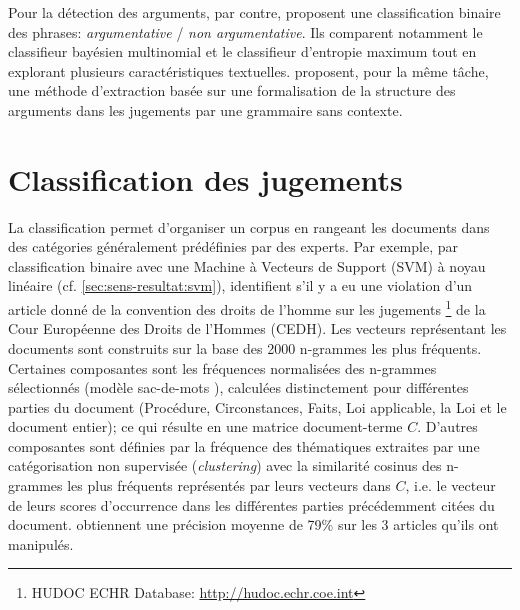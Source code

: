 Pour la détection des arguments, par contre, \citet{moens2007NBvsMaxent4arguments} proposent une classification binaire des phrases: \textit{argumentative} / \textit{non argumentative}. Ils comparent notamment le classifieur bayésien multinomial et le classifieur d'entropie maximum tout en explorant plusieurs caractéristiques textuelles. \citet{mochales2008contextfreegrammararg} proposent, pour la même tâche, une méthode d'extraction basée sur une formalisation de la structure des arguments dans les jugements par une grammaire sans contexte. 


\section{Classification des jugements}
La classification permet d'organiser un corpus en rangeant les documents dans des catégories généralement prédéfinies par des experts. Par exemple, par classification binaire avec une Machine à Vecteurs de Support (SVM) \citep{vapnik1995statlearning} à noyau linéaire (cf. \ref{sec:sens-resultat:svm}),  \citet{Aletras2016predictDecisionECHR} identifient s'il y a eu une violation d'un article donné de la convention des droits de l'homme sur les jugements \footnote{HUDOC ECHR Database: \url{http://hudoc.echr.coe.int}} de la Cour Européenne des Droits de l'Hommes (CEDH). Les vecteurs représentant les documents sont construits sur la base des 2000 n-grammes les plus fréquents. Certaines composantes  sont les fréquences normalisées des n-grammes sélectionnés (modèle sac-de-mots \citep{salton1975BoW, salton1983modernIR_BoW}), calculées distinctement pour différentes parties du document (Procédure, Circonstances, Faits, Loi applicable, la Loi et le document entier); ce qui résulte en une matrice document-terme $C$. D'autres composantes sont définies par la fréquence des thématiques extraites par une catégorisation non supervisée (\textit{clustering}) avec la similarité cosinus des n-grammes les plus fréquents représentés par leurs vecteurs dans $C$, i.e. le vecteur de leurs scores d'occurrence dans les différentes parties précédemment citées du document. \citet{Aletras2016predictDecisionECHR} obtiennent une précision moyenne de 79\% sur les 3 articles qu'ils ont manipulés. 
